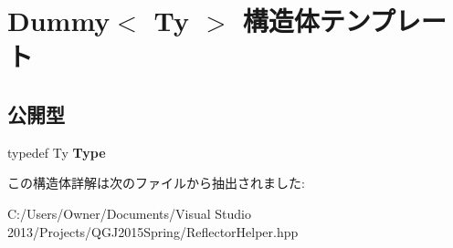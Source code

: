 \hypertarget{struct_dummy}{}\section{Dummy$<$ Ty $>$ 構造体テンプレート}
\label{struct_dummy}
\subsection*{公開型}
\begin{DoxyCompactItemize}
\item 
typedef Ty {\bfseries Type}\hypertarget{struct_dummy_a5d189a74410734d2536d46a56a05d363}{}\label{struct_dummy_a5d189a74410734d2536d46a56a05d363}

\end{DoxyCompactItemize}


この構造体詳解は次のファイルから抽出されました\+:\begin{DoxyCompactItemize}
\item 
C\+:/\+Users/\+Owner/\+Documents/\+Visual Studio 2013/\+Projects/\+Q\+G\+J2015\+Spring/Reflector\+Helper.\+hpp\end{DoxyCompactItemize}
